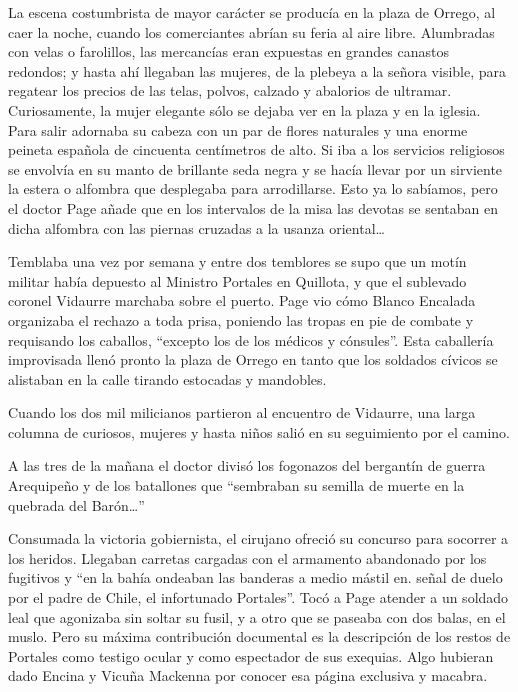 \documentclass[10pt,twoside,openright]{memoir}
\begin{document}
La escena costumbrista de mayor carácter se producía en la plaza de
Orrego, al caer la noche, cuando los comerciantes abrían su feria al
aire libre. Alumbradas con velas o farolillos, las mercancías eran
expuestas en grandes canastos redondos; y hasta ahí llegaban las
mujeres, de la plebeya a la señora visible, para regatear los precios de
las telas, polvos, calzado y abalorios de ultramar. Curiosamente, la
mujer elegante sólo se dejaba ver en la plaza y en la iglesia. Para
salir adornaba su cabeza con un par de flores naturales y una enorme
peineta española de cincuenta centímetros de alto. Si iba a los
servicios religiosos se envolvía en su manto de brillante seda negra y
se hacía llevar por un sirviente la estera o alfombra que desplegaba
para arrodillarse. Esto ya lo sabíamos, pero el doctor Page añade que en
los intervalos de la misa las devotas se sentaban en dicha alfombra con
las piernas cruzadas a la usanza oriental\ldots{}

Temblaba una vez por semana y entre dos temblores se supo que un motín
militar había depuesto al Ministro Portales en Quillota, y que el
sublevado coronel Vidaurre marchaba sobre el puerto. Page vio cómo
Blanco Encalada organizaba el rechazo a toda prisa, poniendo las tropas
en pie de combate y requisando los caballos, ``excepto los de los médicos
y cónsules''. Esta caballería improvisada llenó pronto la plaza de Orrego
en tanto que los soldados cívicos se alistaban en la calle tirando
estocadas y mandobles.

Cuando los dos mil milicianos partieron al encuentro de Vidaurre, una
larga columna de curiosos, mujeres y hasta niños salió en su seguimiento
por el camino.

A las tres de la mañana el doctor divisó los fogonazos del bergantín de
guerra Arequipeño y de los batallones que ``sembraban su semilla de
muerte en la quebrada del Barón\ldots''

Consumada la victoria gobiernista, el cirujano ofreció su concurso para
socorrer a los heridos. Llegaban carretas cargadas con el armamento
abandonado por los fugitivos y ``en la bahía ondeaban las banderas a
medio mástil en. señal de duelo por el padre de Chile, el infortunado
Portales''. Tocó a Page atender a un soldado leal que agonizaba sin
soltar su fusil, y a otro que se paseaba con dos balas, en el muslo.
Pero su máxima contribución documental es la descripción de los restos
de Portales como testigo ocular y como espectador de sus exequias. Algo
hubieran dado Encina y Vicuña Mackenna por conocer esa página exclusiva
y macabra.
\end{document}
